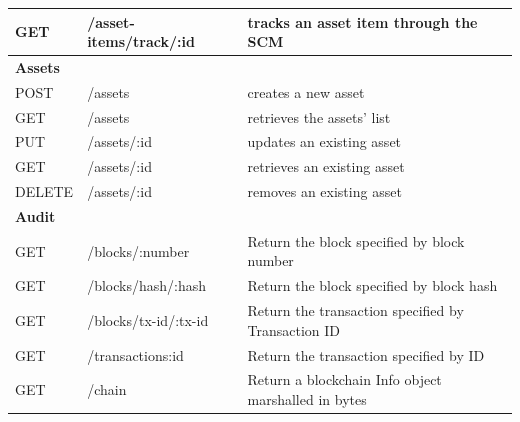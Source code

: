 \begin{table}[htb]
\begin{center}
\begin{tabular}{|l|p{4.5cm}|p{7.664cm}|}
        \hline 
        GET & /asset-items/track/:id & tracks an asset item through the SCM\\
        \hline
        \cellcolor{cyan}\textbf{Assets}  & \cellcolor{cyan}\textbf{} & \cellcolor{cyan}\textbf{} \\
        \hline 
        POST & /assets & creates a new asset\\
        \hline 
        GET & /assets & retrieves the assets' list\\
        \hline 
        PUT & /assets/:id & updates an existing asset\\
        \hline 
        GET & /assets/:id & retrieves an existing asset\\
        \hline 
        DELETE & /assets/:id & removes an existing asset\\
        \hline 
        \cellcolor{cyan}\textbf{Audit}  & \cellcolor{cyan}\textbf{} & \cellcolor{cyan}\textbf{} \\
        \hline
         GET & /blocks/:number & Return the block specified by block number\\
        \hline 
         GET & /blocks/hash/:hash & Return the block specified by block hash\\
        \hline 
         GET & /blocks/tx-id/:tx-id & Return the transaction specified by Transaction ID\\
        \hline 
         GET & /transactions:id & Return the transaction specified by ID\\
        \hline 
         GET & /chain & Return a blockchain Info object marshalled in bytes\\
        \hline 
    \end{tabular}
    \end{center}
\end{table}